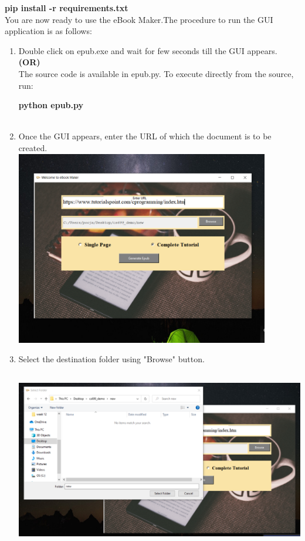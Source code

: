 \documentclass[12pt,a4paper,titlepage]{article}
\begin{document}
\textbf{pip install -r requirements.txt}
\newline \\You are now ready to use the eBook Maker.The procedure to run the GUI application is as follows:
\begin{enumerate}
\item Double click on epub.exe and wait for few seconds till the GUI appears.
\\\newline \textbf{(OR)} \newline\\
The source code is available in epub.py. To execute directly from the source, run:
\newline 

\textbf{python epub.py}
\\
\\
\newpage
\item Once the GUI appears, enter the URL of which the document is to be created.
\newline \\\includegraphics[width=\textwidth,height=8.5cm]{1.png}
\newline 
\item Select the destination folder using "Browse" button.
\newline \\\includegraphics[width=\textwidth,height=8.5cm]{2.png}

\end{enumerate}
\end{document}
